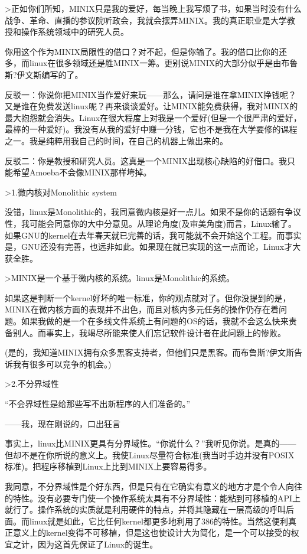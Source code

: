 >正如你们所知，MINIX只是我的爱好，每当晚上我写烦了书，如果当时没有什么战争、革命、直播的参议院听政会，我就会摆弄MINIX。我的真正职业是大学教授和操作系统领域中的研究人员。

 

你用这个作为MINIX局限性的借口？对不起，但是你输了。我的借口比你的还多，而linux在很多领域还是胜MINIX一筹。更别说MINIX的大部分似乎是由布鲁斯?伊文斯编写的了。

反驳一：你说你把MINIX当作爱好来玩——那么，请问是谁在拿MINIX挣钱呢？又是谁在免费发送linux呢？再来谈谈爱好。让MINIX能免费获得，我对MINIX的最大抱怨就会消失。Linux在很大程度上对我是一个爱好(但是一个很严肃的爱好，最棒的一种爱好)。我没有从我的爱好中赚一分钱，它也不是我在大学要修的课程之一。我是纯粹用我自己的时间，在自己的机器上做出来的。

反驳二：你是教授和研究人员。这真是一个MINIX出现核心缺陷的好借口。我只能希望Amoeba不会像MINIX那样垮掉。

 

>1.微内核对Monolithic system

没错，linux是Monolithic的，我同意微内核是好一点儿。如果不是你的话题有争议性，我可能会同意你的大中分意见。从理论角度(及审美角度)而言，Linux输了。如果GNU的kernel在去年春天就已完善的话，我可能就不会开始这个工程。而事实是，GNU还没有完善，也远非如此。如果现在就已实现的这一点而论，Linux才大获全胜。

>MINIX是一个基于微内核的系统。linux是Monolithic的系统。

如果这是判断一个kernel好坏的唯一标准，你的观点就对了。但你没提到的是，MINIX在微内核方面的表现并不出色，而且对核内多元任务的操作仍存在着问题。如果我做的是一个在多线文件系统上有问题的OS的话，我就不会这么快来责备别人。而事实上，我竭尽所能来使人们忘记软件设计者在此问题上的惨败。

(是的，我知道MINIX拥有众多黑客支持者，但他们只是黑客。而布鲁斯?伊文斯告诉我有很多可以竞争的机会。)

 

>2.不分界域性

“不会界域性是给那些写不出新程序的人们准备的。”

——我，现在刚说的，口出狂言

 

事实上，linux比MINIX更具有分界域性。“你说什么？”我听见你说。是真的——但却不是在你所说的意义上。我使Linux尽量符合标准(我当时手边并没有POSIX标准)。把程序移植到Linux上比到MINIX上要容易得多。

我同意，不分界域性是个好东西，但是只有在它确实有意义的地方才是个令人向往的特性。没有必要专门使一个操作系统太具有不分界域性：能粘到可移植的API上就行了。操作系统的实质就是利用硬件的特点，并将其隐藏在一层高级的呼叫后面。而linux就是如此，它比任何kernel都更多地利用了386的特性。当然这便利真正意义上的kernel变得不可移植，但是这也使设计大为简化，是一个可以接受的权宜之计，因为这首先保证了Linux的诞生。

